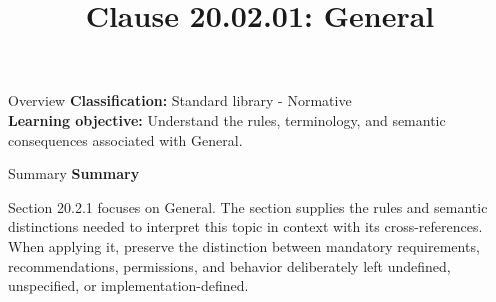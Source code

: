 \documentclass[10pt,letterpaper]{article}
\title{Clause 20.02.01: General}
\author{}
\date{}
\begin{document}
\maketitle
\begin{CornellOverviewBox}{Overview}
\textbf{Classification:} Standard library - Normative\\[2pt]
\textbf{Learning objective:} Understand the rules, terminology, and semantic consequences associated with General.
\end{CornellOverviewBox}\begin{CornellSummaryBox}{Summary}
{\sffamily\bfseries\color{Accent} Summary}\par\vspace{3pt}Section 20.2.1 focuses on General. The section supplies the rules and semantic distinctions needed to interpret this topic in context with its cross-references. When applying it, preserve the distinction between mandatory requirements, recommendations, permissions, and behavior deliberately left undefined, unspecified, or implementation-defined.
\end{CornellSummaryBox}
\end{document}
